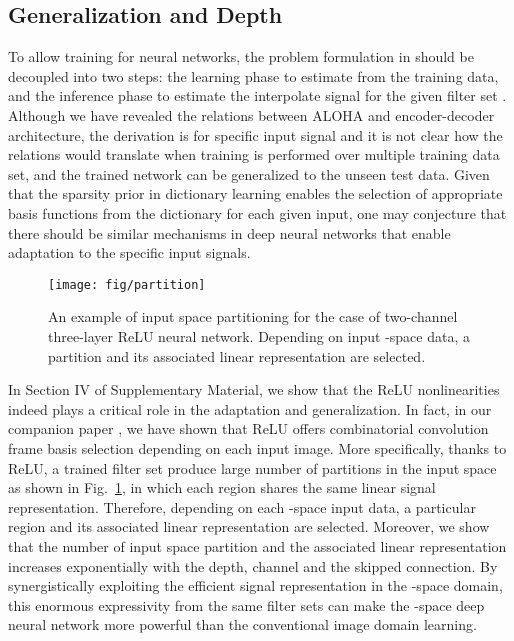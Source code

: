 \documentclass[10pt,journal]{IEEEtran}
\newcommand{\0}{{\boldsymbol{0}}}
\begin{document}
\subsection{Generalization and Depth}
 



To allow  training for neural networks, the problem formulation
in   should be decoupled into two steps: the learning phase to estimate 
from the training data,  and the inference phase to estimate the
interpolate signal  for the given filter set .
Although we have revealed the relations between ALOHA  and encoder-decoder architecture, the derivation is for specific input signal and it is not clear how 
 the relations would translate when training is performed over multiple training data set,
and the trained network can be  generalized to the unseen test data.
Given that
the  sparsity prior in dictionary learning enables the selection of appropriate basis functions from the dictionary for each given
input, one may conjecture that
there should be similar mechanisms in deep neural networks that enable adaptation  to the specific input signals.


\begin{figure}[!h] 	
\centering
{\texttt{[image: fig/partition]}}
\caption{An example of  input space partitioning for the case of two-channel three-layer ReLU neural network.
Depending on input -space data, a partition and its associated linear representation are selected. }\label{fig:input}
\end{figure}



In Section IV of Supplementary Material,  we show that the ReLU nonlinearities indeed plays a critical role
in  the adaptation and generalization.
In fact, 
in our companion paper \cite{ye2019cnn},  
we have shown that ReLU offers  combinatorial convolution frame basis selection depending on each input image.
More specifically,
 thanks to ReLU, a trained filter set produce  large number of 
  partitions in the input space as shown in Fig.~\ref{fig:input},
 in which each region shares the same linear signal representation. Therefore, depending on each -space  input data,  a particular region and its associated linear representation are selected.
Moreover,  we show that
the number of input space partition and the
associated linear representation increases exponentially with the depth, channel and the skipped connection. 
By synergistically exploiting the efficient signal representation  in the -space domain,
this enormous expressivity from the same filter sets can make the -space deep neural
network more powerful than the conventional image domain learning.
\end{document}
